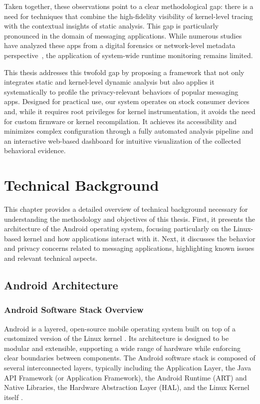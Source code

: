 \documentclass[a4paper,12pt]{report}
\begin{document}
Taken together, these observations point to a clear methodological gap: there is a need for techniques that combine the high-fidelity visibility of kernel-level tracing with the contextual insights of static analysis. This gap is particularly pronounced in the domain of messaging applications. While numerous studies have analyzed these apps from a digital forensics or network-level metadata perspective~\cite{arxiv2020metadata}, the application of system-wide runtime monitoring remains limited.

This thesis addresses this twofold gap by proposing a framework that not only integrates static and kernel-level dynamic analysis but also applies it systematically to profile the privacy-relevant behaviors of popular messaging apps. Designed for practical use, our system operates on stock consumer devices and, while it requires root privileges for kernel instrumentation, it avoids the need for custom firmware or kernel recompilation. It achieves its accessibility and minimizes complex configuration through a fully automated analysis pipeline and an interactive web-based dashboard for intuitive visualization of the collected behavioral evidence.

\chapter{Technical Background}

This chapter provides a detailed overview of technical background necessary for understanding the methodology and objectives of this thesis. First, it presents the architecture of the Android operating system, focusing particularly on the Linux-based kernel and how applications interact with it. Next, it discusses the behavior and privacy concerns related to messaging applications, highlighting known issues and relevant technical aspects.

\section{Android Architecture}

\subsection{Android Software Stack Overview}
Android is a layered, open-source mobile operating system built on top of a customized version of the Linux kernel \cite{AOSPArchOverview}. Its architecture is designed to be modular and extensible, supporting a wide range of hardware while enforcing clear boundaries between components. The Android software stack is composed of several interconnected layers, typically including the Application Layer, the Java API Framework (or Application Framework), the Android Runtime (ART) and Native Libraries, the Hardware Abstraction Layer (HAL), and the Linux Kernel itself \cite{tanenbaum2015modern}.
\end{document}
